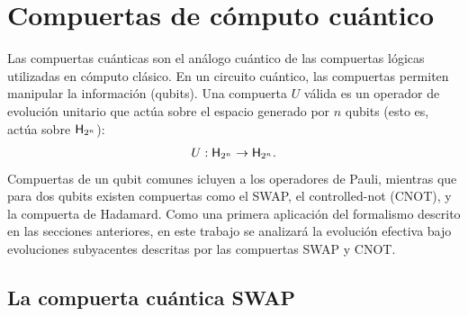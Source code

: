 \section{Compuertas de cómputo cuántico}

Las compuertas cuánticas son el análogo cuántico de las compuertas lógicas utilizadas en cómputo clásico. En un circuito cuántico, las compuertas permiten manipular la información (qubits). Una compuerta $U$ válida es un operador de evolución unitario que actúa sobre el espacio generado por $n$ qubits (esto es, actúa sobre ${\sf H}_{2^{n}}$):
\begin{equation*}
  U:{\sf H}_{2^{n}}\rightarrow{\sf H}_{2^{n}}.
\end{equation*}
Compuertas de un qubit comunes icluyen a los operadores de Pauli, mientras que para dos qubits existen compuertas como el SWAP, el controlled-not (CNOT), y la compuerta de Hadamard. Como una primera aplicación del formalismo descrito en las secciones anteriores, en este trabajo se analizará la evolución efectiva bajo evoluciones subyacentes descritas por las compuertas SWAP y CNOT. 

\subsection{La compuerta cuántica SWAP}

